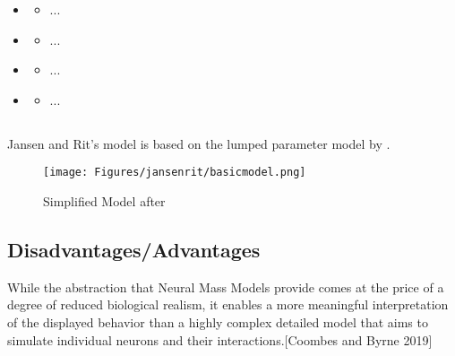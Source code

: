 \begin{itemize}
	\item \parencite{zetterberg_performance_1978}
	\begin{itemize}
		\item ...
	\end{itemize}
\end{itemize}

\begin{itemize}
	\item \parencite{jansen_neurophysiologically-based_1993-1}
	\begin{itemize}
		\item ...
	\end{itemize}
	\item \parencite{jansen_electroencephalogram_1995}
	\begin{itemize}
		\item ...
	\end{itemize}
\end{itemize}

\begin{itemize}
	\item \parencite{david_neural_2003}
	\begin{itemize}
		\item ...
	\end{itemize}
\end{itemize}

\pagebreak

\subsection{\parencite{jansen_electroencephalogram_1995}}

Jansen and Rit's model is based on the lumped parameter model by \parencite{lopes_da_silva_models_1976}. 
\begin{figure}[htp]
	\centering
	\texttt{[image: Figures/jansenrit/basicmodel.png]}
	\caption{Simplified Model after \parencite{jansen_electroencephalogram_1995}}
	\label{Fig: Jansen Rit Simple3}
\end{figure}



\subsection{Disadvantages/Advantages}

While the abstraction that Neural Mass Models provide comes at the price of a degree of reduced biological realism, it enables a more meaningful interpretation of the displayed behavior than a highly complex detailed model that aims to simulate individual neurons and their interactions.[Coombes and Byrne 2019]

